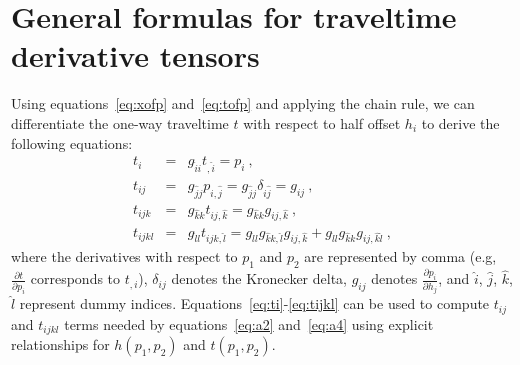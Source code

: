 \section{General formulas for traveltime derivative tensors}

Using equations~\ref{eq:xofp} and~\ref{eq:tofp} and applying the chain rule, we can differentiate the one-way traveltime $t$ with respect to half offset $h_i$ to derive the following equations:
\begin{eqnarray}
\label{eq:ti}
t_i & = & g_{\hat{i}i}t_{,\hat{i}} = p_i~,\\
\label{eq:tij}
t_{ij} & = & g_{\hat{j}j} p_{i,\hat{j}} = g_{\hat{j}j} \delta_{i\hat{j}} = g_{ij}~,\\
\label{eq:tijk}
t_{ijk} & = & g_{\hat{k}k}t_{ij,\hat{k}} = g_{\hat{k}k} g_{ij,\hat{k}} ~,\\
\label{eq:tijkl}
t_{ijkl} & = & g_{\hat{l}l}t_{ijk,\hat{l}} = g_{\hat{l}l}g_{\hat{k}k,\hat{l}}g_{ij,\hat{k}} + g_{\hat{l}l}g_{\hat{k}k} g_{ij,\hat{k}\hat{l}}~,
\end{eqnarray}
where the derivatives with respect to $p_1$ and $p_2$ are represented by comma (e.g, $\frac{\partial t}{\partial p_i}$ corresponds to $t_{,i}$), $\delta_{ij}$ denotes the Kronecker delta, $g_{ij}$ denotes $\frac{\partial p_i}{\partial h_j}$, and $\hat{i}$, $\hat{j}$, $\hat{k}$, $\hat{l}$ represent dummy indices. Equations~\ref{eq:ti}-\ref{eq:tijkl} can be used to compute $t_{ij}$ and $t_{ijkl}$ terms needed by equations~\ref{eq:a2} and~\ref{eq:a4} using explicit relationships for $h(p_1,p_2)$ and $t(p_1,p_2)$.

